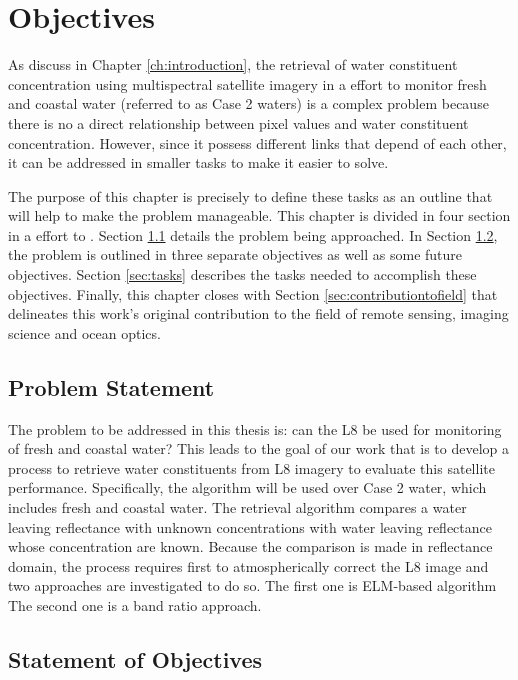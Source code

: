 \chapter{Objectives}\label{ch:objectives}
As discuss in Chapter \ref{ch:introduction},  the retrieval of water constituent concentration using multispectral satellite imagery in a effort to monitor fresh and coastal water (referred to as Case 2 waters) is a complex problem because there is no a direct relationship between pixel values and water constituent concentration. However, since it possess different links that depend of each other, it can be addressed in smaller tasks to make it easier to solve. 

The purpose of this chapter is precisely to define these tasks as an outline that will help to make the problem manageable. This  chapter is divided in four section in a effort to . Section \ref{sec:problemstatement} details the problem being approached. In Section \ref{sec:objectives}, the problem is outlined in {\color{red} three} separate objectives as well as some future objectives. Section \ref{sec:tasks} describes the tasks needed to accomplish these objectives. Finally, this chapter closes with Section \ref{sec:contributiontofield} that delineates this work's original contribution to the field of remote sensing, imaging science and ocean optics. 
\section{Problem Statement}
\label{sec:problemstatement}
The problem to be addressed in this thesis is: can the L8 be used for monitoring of fresh and coastal water? This leads to the goal of our work that is to develop a process to retrieve water constituents from L8 imagery to evaluate this satellite performance. Specifically, the algorithm will be used over Case 2 water, which includes fresh and coastal water. The retrieval algorithm compares a water leaving reflectance with unknown concentrations with water leaving reflectance whose concentration are known. Because the comparison is made in reflectance domain, the process requires first to atmospherically correct the L8 image and two approaches are investigated to do so. The first one is ELM-based algorithm The second one is a band ratio approach.

\section{Statement of Objectives}
\label{sec:objectives}

